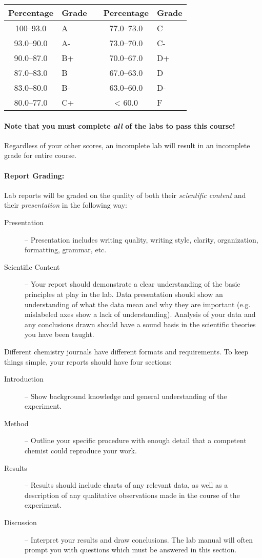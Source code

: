 \documentclass[12pt, letterpaper]{article}
\begin{document}
\begin{tabular}{cl|c|cl}
	Percentage & Grade &  & Percentage & Grade \\ \midrule
	100--93.0  & A     &  & 77.0--73.0 & C     \\
	93.0--90.0 & A-    &  & 73.0--70.0 & C-    \\
	90.0--87.0 & B+    &  & 70.0--67.0 & D+    \\
	87.0--83.0 & B     &  & 67.0--63.0 & D     \\
	83.0--80.0 & B-    &  & 63.0--60.0 & D-    \\
	80.0--77.0 & C+    &  & < 60.0     & F
\end{tabular}

\paragraph{Note that you must complete \emph{all} of the labs to pass this course!} Regardless of your other scores, an incomplete lab will result in an incomplete grade for entire course.

\paragraph{Report Grading:}
Lab reports will be graded on the quality of both their \emph{scientific content} and their \emph{presentation} in the following way:
\begin{description}
	\item[Presentation] -- Presentation includes writing quality, writing style, clarity, organization, formatting, grammar, etc.

	\item[Scientific Content] -- Your report should demonstrate a clear understanding of the basic principles at play in the lab. Data presentation should show an understanding of what the data mean and why they  are important (e.g. mislabeled axes show a lack of understanding). Analysis of your data and any conclusions drawn should have a sound basis in the scientific theories you have been taught.
\end{description}

Different chemistry journals have different formats and requirements. To keep things simple, your reports should have four sections:
\begin{description}
	\item[Introduction] -- Show background knowledge and general understanding of the experiment.
	\item[Method] -- Outline your specific procedure with enough detail that a competent chemist could reproduce your work.
	\item[Results] -- Results should include charts of any relevant data, as well as a description of any qualitative observations made in the course of the experiment.
	\item[Discussion] -- Interpret your results and draw conclusions. The lab manual will often prompt you with questions which must be answered in this section.
\end{description}
\end{document}
